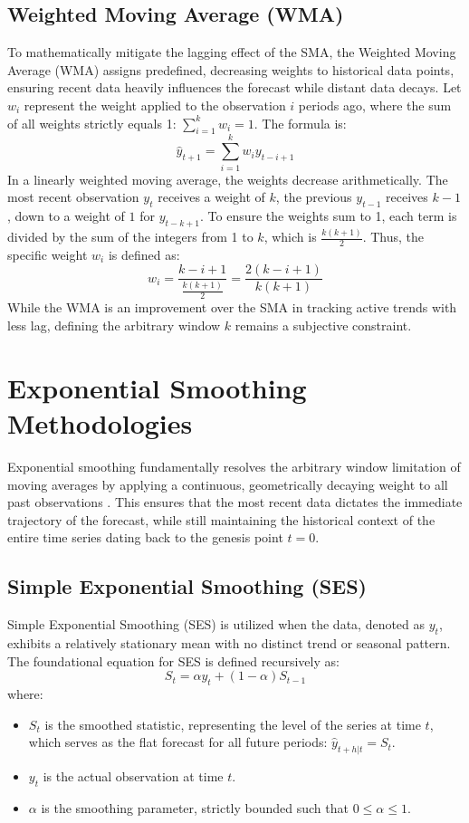 \documentclass[11pt, a4paper]{report}
\begin{document}
\subsection{Weighted Moving Average (WMA)}
To mathematically mitigate the lagging effect of the SMA, the Weighted Moving Average (WMA) assigns predefined, decreasing weights to historical data points, ensuring recent data heavily influences the forecast while distant data decays. Let $w_i$ represent the weight applied to the observation $i$ periods ago, where the sum of all weights strictly equals 1: $\sum_{i=1}^{k} w_i = 1$. The formula is:
\begin{equation}
    \hat{y}_{t+1} = \sum_{i=1}^{k} w_i y_{t-i+1}
\end{equation}
In a linearly weighted moving average, the weights decrease arithmetically. The most recent observation $y_t$ receives a weight of $k$, the previous $y_{t-1}$ receives $k-1$, down to a weight of $1$ for $y_{t-k+1}$. To ensure the weights sum to 1, each term is divided by the sum of the integers from 1 to $k$, which is $\frac{k(k+1)}{2}$. Thus, the specific weight $w_i$ is defined as:
\begin{equation}
    w_i = \frac{k - i + 1}{\frac{k(k+1)}{2}} = \frac{2(k - i + 1)}{k(k+1)}
\end{equation}
While the WMA is an improvement over the SMA in tracking active trends with less lag, defining the arbitrary window $k$ remains a subjective constraint.

\section{Exponential Smoothing Methodologies}
Exponential smoothing fundamentally resolves the arbitrary window limitation of moving averages by applying a continuous, geometrically decaying weight to all past observations \cite{Hyndman2008}. This ensures that the most recent data dictates the immediate trajectory of the forecast, while still maintaining the historical context of the entire time series dating back to the genesis point $t=0$.

\subsection{Simple Exponential Smoothing (SES)}
Simple Exponential Smoothing (SES) is utilized when the data, denoted as $y_t$, exhibits a relatively stationary mean with no distinct trend or seasonal pattern. The foundational equation for SES is defined recursively as:
\begin{equation}
    S_t = \alpha y_t + (1 - \alpha) S_{t-1}
\end{equation}
where:
\begin{itemize}
    \item $S_t$ is the smoothed statistic, representing the level of the series at time $t$, which serves as the flat forecast for all future periods: $\hat{y}_{t+h|t} = S_t$.
    \item $y_t$ is the actual observation at time $t$.
    \item $\alpha$ is the smoothing parameter, strictly bounded such that $0 \le \alpha \le 1$.
\end{itemize}
\end{document}
